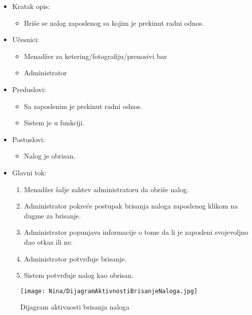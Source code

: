 \documentclass[a4paper]{article}
\begin{document}
\begin{itemize}
    \item Kratak opis: 
    \begin{itemize}
        \item Briše se nalog zaposlenog sa kojim je prekinut radni odnos.
    \end{itemize}
    \item Učesnici:
        \begin{itemize}
        \item Menadžer za ketering/fotografiju/prenosivi bar
        \item Administrator
    \end{itemize}
    \item Preduslovi:
        \begin{itemize}
            \item Sa zaposlenim je prekinut radni odnos.
            \item Sistem je u funkciji.
        \end{itemize}
    \item Postuslovi:
        \begin{itemize}
            \item Nalog je obrisan.
        \end{itemize}
    \item Glavni tok:
        \begin{enumerate}
            \item Menadžer šalje zahtev administratoru da obriše nalog.
            \item Administrator pokreće postupak brisanja naloga zaposlenog klikom na dugme za brisanje.
            \item Administrator popunjava informacije o tome da li je zaposleni svojevoljno dao otkaz ili ne.
            \item Administrator potvrđuje brisanje.
            \item Sistem potvrđuje nalog kao obrisan.
        \end{enumerate}
\end{itemize}

\begin{figure}[H]
    \centering
    \texttt{[image: Nina/DijagramAktivnostiBrisanjeNaloga.jpg]}
    \caption{Dijagram aktivnosti brisanja naloga}
    \label{fig:RegistracijaZ}
\end{figure}


\end{document}
